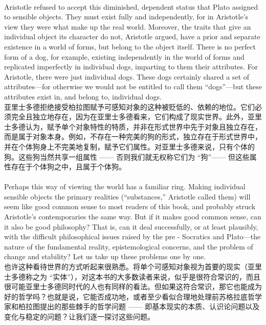 \documentclass{article}
\begin{document}
\\
Aristotle refused to accept this diminished, dependent status that Plato assigned to sensible objects. They must exist fully and independently, for in Aristotle’s view they were what make up the real world. Moreover, the traits that give an individual object its character do not, Aristotle argued, have a prior and separate existence in a world of forms, but belong to the object itself. There is no perfect form of a dog, for example, existing independently in the world of forms and replicated imperfectly in individual dogs, imparting to them their attributes. For Aristotle, there were just individual dogs. These dogs certainly shared a set of attributes—for otherwise we would not be entitled to call them “dogs”—but these attributes exist in, and belong to, individual dogs.\\
亚里士多德拒绝接受柏拉图赋予可感知对象的这种被贬低的、依赖的地位。它们必须完全且独立地存在，因为在亚里士多德看来，它们构成了现实世界。此外，亚里士多德认为，赋予单个对象特性的特质，并非在形式世界中先于对象且独立存在，而是属于对象本身。例如，不存在一种完美的狗的形式，独立存在于形式世界中，并在个体狗身上不完美地复制，赋予它们属性。对亚里士多德来说，只有个体的狗。这些狗当然共享一组属性 —— 否则我们就无权称它们为 “狗”—— 但这些属性存在于个体狗之中，且属于个体狗。\\

\\
Perhaps this way of viewing the world has a familiar ring. Making individual sensible objects the primary realities (“substances,” Aristotle called them) will seem like good common sense to most readers of this book, and probably struck Aristotle’s contemporaries the same way. But if it makes good common sense, can it also be good philosophy? That is, can it deal successfully, or at least plausibly, with the difficult philosophical issues raised by the pre - Socratics and Plato—the nature of the fundamental reality, epistemological concerns, and the problem of change and stability? Let us take up these problems one by one.\\
也许这种看待世界的方式听起来很熟悉。将单个可感知对象视为首要的现实（亚里士多德称之为 “实体”），对这本书的大多数读者来说，似乎是很符合常识的，而且很可能亚里士多德同时代的人也有同样的看法。但如果这符合常识，那它也能成为好的哲学吗？也就是说，它能否成功地，或者至少看似合理地处理前苏格拉底哲学家和柏拉图提出的那些棘手的哲学问题 —— 即基本现实的本质、认识论问题以及变化与稳定的问题？让我们逐一探讨这些问题。\\
\end{document}
